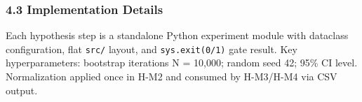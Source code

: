 \begin{table}[htbp]
\centering
{}
\end{table}

\subsubsection{4.3 Implementation Details}

Each hypothesis step is a standalone Python experiment module with dataclass configuration, flat \texttt{src/} layout, and \texttt{sys.exit(0/1)} gate result. Key hyperparameters: bootstrap iterations N = 10,000; random seed 42; 95\% CI level. Normalization applied once in H-M2 and consumed by H-M3/H-M4 via CSV output.

